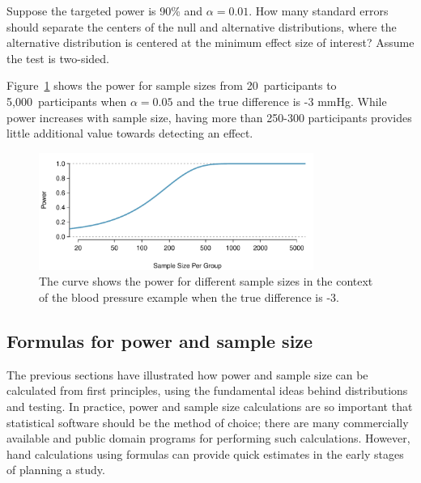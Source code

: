 \begin{exercisewrap}
\begin{nexercise}
Suppose the targeted power is 90\% and $\alpha = 0.01$. How many standard errors should separate the centers of the null and alternative distributions, where the alternative distribution is centered at the minimum effect size of interest? Assume the test is two-sided.\footnotemark{}
\end{nexercise}
\end{exercisewrap}

\textD{\newpage}

Figure~\ref{power_curve_neg-3} shows the power for sample sizes from 20~participants to 5,000~participants when $\alpha = 0.05$ and the true difference is -3 mmHg. While power increases with sample size, having more than 250-300 participants provides little additional value towards detecting an effect. 

\begin{figure}[h]
\centering
\includegraphics[width=0.80\textwidth]{ch_inference_for_means_oi_biostat/figures/power_curve/power_curve_neg-3}
\caption{The curve shows the power for different sample sizes in the context of the blood pressure example when the true difference is -3.}
\label{power_curve_neg-3}
\end{figure}



\subsection{Formulas for power and sample size}

The previous sections have illustrated how power and sample size can be calculated from first principles, using the fundamental ideas behind distributions and testing. In practice, power and sample size calculations are so important that statistical software should be the method of choice; there are many commercially available and public domain programs for performing such calculations. However, hand calculations using formulas can provide quick estimates in the early stages of planning a study.

